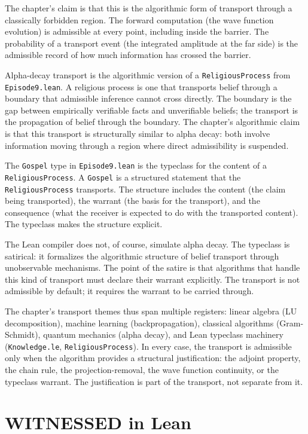 The chapter's claim is that this is the algorithmic form of
transport through a classically forbidden region. The forward
computation (the wave function evolution) is admissible at every
point, including inside the barrier. The probability of a
transport event (the integrated amplitude at the far side) is the
admissible record of how much information has crossed the
barrier.

Alpha-decay transport is the algorithmic version of a
\texttt{ReligiousProcess} from \texttt{Episode9.lean}. A
religious process is one that transports belief through a
boundary that admissible inference cannot cross directly. The
boundary is the gap between empirically verifiable facts and
unverifiable beliefs; the transport is the propagation of belief
through the boundary. The chapter's algorithmic claim is that
this transport is structurally similar to alpha decay: both
involve information moving through a region where direct
admissibility is suspended.

The \texttt{Gospel} type in \texttt{Episode9.lean} is the
typeclass for the content of a \texttt{ReligiousProcess}. A
\texttt{Gospel} is a structured statement that the
\texttt{ReligiousProcess} transports. The structure includes the
content (the claim being transported), the warrant (the basis
for the transport), and the consequence (what the receiver is
expected to do with the transported content). The typeclass
makes the structure explicit.

The Lean compiler does not, of course, simulate alpha decay. The
typeclass is satirical: it formalizes the algorithmic structure
of belief transport through unobservable mechanisms. The point of
the satire is that algorithms that handle this kind of transport
must declare their warrant explicitly. The transport is not
admissible by default; it requires the warrant to be carried
through.

The chapter's transport themes thus span multiple registers:
linear algebra (LU decomposition), machine learning
(backpropagation), classical algorithms (Gram-Schmidt), quantum
mechanics (alpha decay), and Lean typeclass machinery
(\texttt{Knowledge.le}, \texttt{ReligiousProcess}). In every
case, the transport is admissible only when the algorithm
provides a structural justification: the adjoint property, the
chain rule, the projection-removal, the wave function continuity,
or the typeclass warrant. The justification is part of the
transport, not separate from it.

\section{WITNESSED in Lean}
\label{se:witnessed-in-lean}

